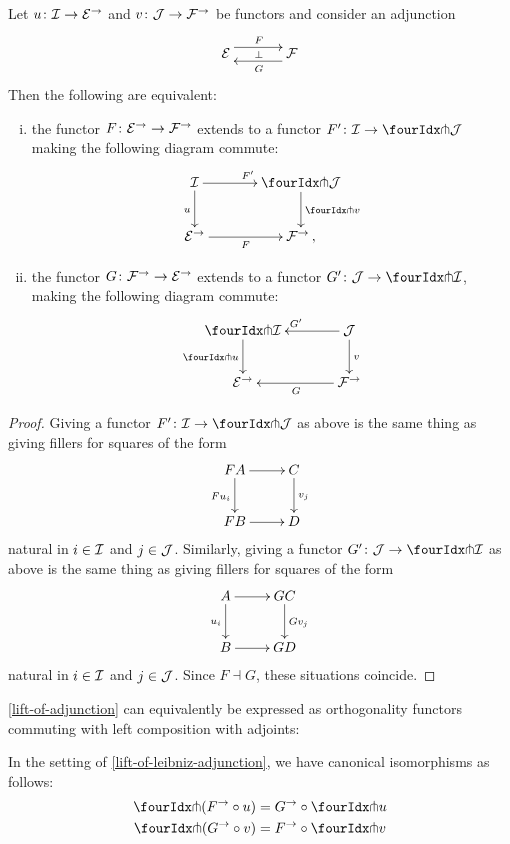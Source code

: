 \documentclass[reqno,10pt,a4paper,oneside]{amsart}
\begin{document}
\begin{proposition} \label{lift-of-adjunction} 
Let $u \co \cal{I} \to \cal{E}^{\to}$ and $v \co \cal{J} \to \cal{F}^{\to}$ be functors and consider an adjunction
\[
\xymatrix@C+1em{
  \cal{E}
  \ar@<5pt>[r]^{F}
  \ar@{}[r]|{\bot}
&
  \cal{F}
  \ar@<5pt>[l]^{G}
}
\]
Then the following are equivalent:
\begin{enumerate}[(i)]
\item the functor $F \co \cal{E}^\to \to \cal{F}^\to$ extends to a functor $F' \co \cal{I} \to \liftl{\cal{J}}$ making the following diagram commute:
\[
\xymatrix@C=1.2cm{
  \cal{I}
  \ar[r]^{F'}
  \ar[d]_{u}
&
  \liftl{\cal{J}}
  \ar[d]^{\liftl{v}}
\\
  \cal{E}^{\to}
  \ar[r]_-{F}
&
  \cal{F}^{\to}\, ,}
\]
\item the functor $G \co \cal{F}^\to \to \cal{E}^\to$ extends to a functor $G' \co \cal{J} \to \liftr{\cal{I}}$, making the following diagram commute:
\[
\xymatrix@C=1.2cm{
  \liftr{\cal{I}}
  \ar[d]_{\liftr{u}}
&
  \cal{J}
  \ar[l]_{G'} 
  \ar[d]^{v}
\\
  \cal{E}^{\to}
&
  \cal{F}^{\to}
  \ar[l]^{G}
}
\]
\end{enumerate}
\end{proposition}

\begin{proof} Giving a functor $F' \co \cal{I} \to \liftl{\cal{J}}$ as above is the same thing as giving fillers for squares of the form
\[
\xymatrix{
FA \ar[d]_{F u_i} \ar[r] & C \ar[d]^{v_j} \\
FB \ar[r] & D }
\]
natural in $i  \in \cal{I}$ and $j \in \cal{J}$. Similarly, giving a functor $G' \co \cal{J} \to \liftl{\cal{I}}$ as above is the same thing as giving fillers for squares 
of the form
\[
\xymatrix{
A \ar[d]_{u_i} \ar[r] & GC \ar[d]^{Gv_j} \\
B \ar[r] & GD }
\]
 natural in $i \in \cal{I}$ and $j \in \cal{J}$. Since $F \dashv G$, these situations coincide.
\end{proof}

\cref{lift-of-adjunction} can equivalently be expressed as orthogonality functors commuting with left composition with adjoints:

\begin{corollary}
\label{pitchfork-adjunction}
In the setting of \cref{lift-of-leibniz-adjunction}, we have canonical isomorphisms as follows:
\begin{align*}
\liftr{(F^{\to} \cc u)} &= G^{\to} \cc \liftr{u}
\\
\liftl{(G^{\to} \cc v)} &= F^{\to} \cc \liftl{v}
\end{align*}
\end{corollary}
\end{document}
